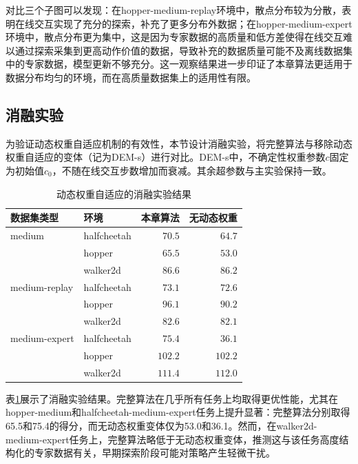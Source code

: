 对比三个子图可以发现：在hopper-medium-replay环境中，散点分布较为分散，表明在线交互实现了充分的探索，补充了更多分布外数据；在hopper-medium-expert环境中，散点分布更为集中，这是因为专家数据的高质量和低方差使得在线交互难以通过探索采集到更高动作价值的数据，导致补充的数据质量可能不及离线数据集中的专家数据，模型更新不够充分。这一观察结果进一步印证了本章算法更适用于数据分布均匀的环境，而在高质量数据集上的适用性有限。


\subsection{消融实验}\label{Sec4.4.4}

为验证动态权重自适应机制的有效性，本节设计消融实验，将完整算法与移除动态权重自适应的变体（记为DEM-s）进行对比。DEM-s中，不确定性权重参数$c$固定为初始值$c_0$，不随在线交互步数增加而衰减。其余超参数与主实验保持一致。

\begin{table}[htbp]
  \centering
  \caption{动态权重自适应的消融实验结果}
  \label{Tab:Chap4_ablation}
  \begin{tabular}{llrr}
    \toprule
    数据集类型         & 环境          & 本章算法            & 无动态权重            \\
    \midrule
    medium        & halfcheetah & $\mathbf{70.5}$ & $64.7$           \\
                  & hopper      & $\mathbf{65.5}$ & $53.0$           \\
                  & walker2d    & $\mathbf{86.6}$ & $86.2$           \\
    \midrule
    medium-replay & halfcheetah & $\mathbf{73.1}$ & $72.6$           \\
                  & hopper      & $\mathbf{96.1}$ & $90.2$           \\
                  & walker2d    & $\mathbf{82.6}$ & $82.1$           \\
    \midrule
    medium-expert & halfcheetah & $\mathbf{75.4}$ & $36.1$           \\
                  & hopper      & $102.2$         & $102.2$          \\
                  & walker2d    & $111.4$         & $\mathbf{112.0}$ \\
    \bottomrule
  \end{tabular}
\end{table}

表\ref{Tab:Chap4_ablation}展示了消融实验结果。完整算法在几乎所有任务上均取得更优性能，尤其在hopper-medium和halfcheetah-medium-expert任务上提升显著：完整算法分别取得65.5和75.4的得分，而无动态权重变体仅为53.0和36.1。然而，在walker2d-medium-expert任务上，完整算法略低于无动态权重变体，推测这与该任务高度结构化的专家数据有关，早期探索阶段可能对策略产生轻微干扰。


